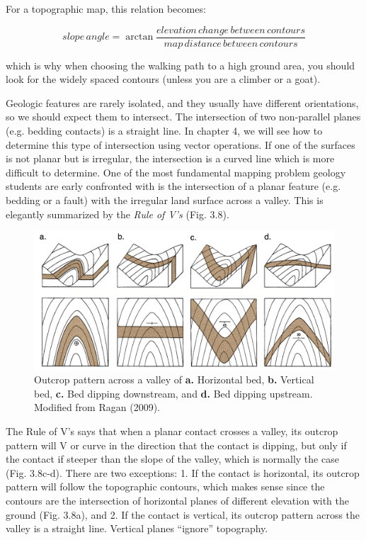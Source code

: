 \documentclass[a4paper , 12pt]{book}
\begin{document}
For a topographic map, this relation becomes:

\begin{equation}
    slope\,angle = \arctan\frac{elevation\,change\,between\,contours}{map\,distance\,between\,contours} \tag{3.5b}
\end{equation}

which is why when choosing the walking path to a high ground area, you should look for the widely spaced contours (unless you are a climber or a goat).

Geologic features are rarely isolated, and they usually have different orientations, so we should expect them to intersect. The intersection of two non-parallel planes (e.g. bedding contacts) is a straight line. In chapter 4, we will see how to determine this type of intersection using vector operations. If one of the surfaces is not planar but is irregular, the intersection is a curved line which is more difficult to determine. One of the most fundamental mapping problem geology students are early confronted with is the intersection of a planar feature (e.g. bedding or a fault) with the irregular land surface across a valley. This is elegantly summarized by the \textit{Rule of V’s} (Fig. 3.8).

\begin{figure}[ht]
    \centering
    \includegraphics[width=13cm]{Figures/ch3f8.png}
    \caption{Outcrop pattern across a valley of \textbf{a.} Horizontal bed, \textbf{b.} Vertical bed, \textbf{c.} Bed dipping downstream, and \textbf{d.} Bed dipping upstream. Modified from Ragan (2009).}
\end{figure}

The Rule of V’s says that when a planar contact crosses a valley, its outcrop pattern will V or curve in the direction that the contact is dipping, but only if the contact if steeper than the slope of the valley, which is normally the case (Fig. 3.8c-d). There are two exceptions: 1. If the contact is horizontal, its outcrop pattern will follow the topographic contours, which makes sense since the contours are the intersection of horizontal planes of different elevation with the ground (Fig. 3.8a), and 2. If the contact is vertical, its outcrop pattern across the valley is a straight line. Vertical planes “ignore” topography.
\end{document}
